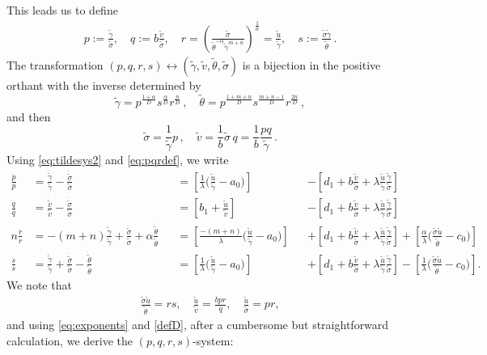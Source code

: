 \documentclass[11pt]{article}
\def\tg{{\tilde{\gamma}}}
\def\tv{{\tilde{v}}}
\def\tth{{\tilde{\theta}}}
\def\ts{{\tilde{\sigma}}}
\def\tu{{\tilde{u}}}
\def\dtg{{\dot{\tilde{\gamma}}}}
\def\dtv{{\dot{\tilde{v}}}}
\def\dtth{{\dot{\tilde{\theta}}}}
\def\dts{{\dot{\tilde{\sigma}}}}
\def\dpp{\dot{p}}
\def\dqq{\dot{q}}
\def\drr{\dot{r}}
\theoremstyle{remark}
\begin{document}
This leads us to define
\begin{equation}\label{eq:pqrdef}
 \begin{aligned}
  p :=\frac{\tg}{\ts}, \quad q :=b \frac{\tv}{\ts},  \quad r = \left ( \frac{\ts}{ \tth^{-\alpha} \tg^{m+n}} \right )^\frac{1}{n} = \frac{\tu}{\tg}  , \quad s := \frac{\ts\tg}{\tth} \, .
 \end{aligned}
\end{equation}
The transformation $(p,q,r,s) \leftrightarrow (\tg,\tv, \tth,\ts)$ is a bijection in the positive orthant with the inverse determined by
$$
\tg = p^\frac{1+\alpha}{D} s^\frac{\alpha}{D} r^\frac{n}{D} \, ,  \quad \tth = p^\frac{1+m+n}{D} s^\frac{m+n-1}{D} r^\frac{2n}{D} \, ,
$$
and then
$$
\ts = \frac{1}{\tg} p \, , \quad \tv = \frac{1}{b} \ts \, q = \frac{1}{b} \frac{ p q}{\tg} \, .
$$
Using \eqref{eq:tildesys2} and \eqref{eq:pqrdef}, we write
\begin{align*}
 \frac{\dpp}{p}&=\frac{\dtg}{\tg} - \frac{\dts}{\ts}& &=\left[\frac{1}{\lambda }\Big(\frac{\tu}{\tg}-a_0\Big)\right] & &-\left[d_1 + b\frac{\tv}{\ts} +
 \lambda   \frac{\tu}{\tg} \frac{\tg}{\ts}  \right]
 \\
 \frac{\dqq}{q}&=\frac{\dtv}{\tv} - \frac{\dts}{\ts}& &=\left[b_1 +\frac{\tu}{\tv}\right] & &-\left[d_1 + b\frac{\tv}{\ts} + \lambda  \frac{\tu}{\tg} \frac{\tg}{\ts}    \right]
 \\
 n\frac{\drr}{r}&=-(m+n)\frac{\dtg}{\tg}+\frac{\dts}{\ts} + \alpha\frac{\dtth}{\tth} & &=\left[\frac{-(m+n)}{\lambda}\Big(\frac{\tu}{\tg}-a_0\Big)\right]& &+
 \left[d_1 + b\frac{\tv}{\ts} + \lambda  \frac{\tu}{\tg} \frac{\tg}{\ts}   \right] + \left[\frac{\alpha}{\lambda }\Big(\frac{\ts\tu}{\tth}-c_0\Big)\right]\\
 \frac{\dot{s}}{s} &= \frac{\dtg}{\tg} + \frac{\dts}{\ts} - \frac{\dtth}{\tth} & &=\left[\frac{1}{\lambda }\Big(\frac{\tu}{\tg}-a_0\Big)\right] & &+\left[d_1 + b\frac{\tv}{\ts}
 + \lambda  \frac{\tu}{\tg} \frac{\tg}{\ts}  \right] -\left[\frac{1}{\lambda }\Big(\frac{\ts\tu}{\tth}-c_0\Big)\right].%
\end{align*}
We note that
\begin{align*}
 \frac{\ts\tu}{\tth} = rs, \quad \frac{\tu}{\tv} = \frac{bpr}{q}, \quad \frac{\tu}{\ts} = pr,
\end{align*}
and using \eqref{eq:exponents} and \eqref{defD}, after a cumbersome but straightforward calculation, we derive the $(p,q,r,s)$-system:
\end{document}
